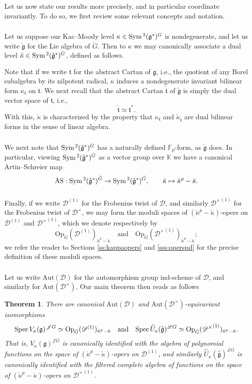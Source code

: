\documentclass{amsart}
\newtheorem{Thm}{Theorem}[subsection]
\theoremstyle{definition}
\newcommand{\sss}{\subsubsection{}}
\newcommand{\fg}{\mathfrak{g}}
\newcommand{\Spec}{\on{Spec}\hspace{.5mm}}
\newcommand{\ft}{\mathfrak{t}}
\newcommand{\fr}{^\on{(1)}}
\newcommand{\sD}{\mathscr{D}}
\newcommand{\Sym}{\on{Sym}\hspace{.5mm}}
\newcommand{\on}{\mathrm}
\newcommand{\Jet}{\mathscr{J}}
\newcommand{\Loop}{\mathscr{L}}
\newcommand{\K}{\mathbb{K}}
\newcommand{\pD}{\sD^\times}
\newcommand{\ckappa}{\check{\kappa}}
\newcommand{\Op}{\on{Op}}
\newcommand{\Aut}{\on{Aut}}
\numberwithin{equation}{section}
\begin{document}
{ 
\sss Let us now state our results more precisely, and in particular coordinate invariantly. To do so, we first review some relevant concepts and notation. 

\sss Let us suppose our Kac--Moody level $\kappa \in \Sym^2(\fg^*)^G$ is nondegenerate, and let us write $\check{\fg}$ for the Lie algebra of $\check{G}$. Then to $\kappa$ we may canonically associate a dual level   $\ckappa \in \Sym^2(\check{\fg}^*)^{\check{G}}$, defined as follows. 

Note that if we write $\ft$ for the abstract Cartan of $\fg$, i.e., the quotient of any Borel subalgebra by its nilpotent radical, $\kappa$ induces a nondegenerate invariant bilinear form $\kappa_\ft$ on $\ft$. We next recall that the abstract Cartan $\check{\ft}$ of $\check{\fg}$ is simply the dual vector space of $\ft$, i.e., $$\check{\ft} \simeq \ft^*.$$With this, $\ckappa$ is characterized by the property that $\kappa_\ft$ and $\ckappa_{\check{\ft}}$ are dual bilinear forms in the sense of linear algebra. 

\sss We next note that $\Sym^2(\check{\fg}^*)^{\check{G}}$ has a naturally defined $\mathbb{F}_p$-form, as $\check{\fg}$ does. In particular, viewing $\Sym^2(\check{\fg}^*)^{\check{G}}$ as a vector group over $\K$ we have a canonical Artin--Schreier map
$$\on{AS}: \Sym^2(\check{\fg}^*)^{\check{G}} \rightarrow \Sym^2(\check{\fg}^*)^{\check{G}}, \quad \quad \ckappa \mapsto \ckappa^p - \ckappa.$$

\sss Finally, if we write $\sD\fr$ for the Frobenius twist of $\sD$, and similarly ${\pD}\fr$ for the Frobenius twist of $\pD$, we may form the moduli spaces of $(\ckappa^p - \ckappa)$-opers on $\sD\fr$ and ${\pD}\fr$, which we denote respectively by 
$$\Op_{\check{G}}(\sD\fr)_{\ckappa^p - \ckappa} \quad \text{and} \quad \Op_{\check{G}}({\pD}\fr)_{\ckappa^p - \ckappa};$$
we refer the reader to Sections \ref{ss:kappaopers} and \ref{sss:operspd} for the precise definition of these moduli spaces.

\sss Let us write $\Aut(\sD)$ for the automorphism group ind-scheme of $\sD$, and similarly for $\Aut(\pD)$. Our main theorem then reads as follows

\begin{Thm} \label{t:thmintro} There are canonical $\Aut(\sD)$ and $\Aut(\pD)$-equivariant isomorphisms 
$$\Spec V_\kappa(\fg)^{\Jet G} \simeq \Op_{\check{G}}(\sD\fr)_{\ckappa^p - \ckappa} \quad \text{and} \quad \Spec \widehat{U}_\kappa(\hat{\fg})^{\Loop G} \simeq \Op_{\check{G}}({\pD}\fr)_{\ckappa^p - \ckappa}.$$
That is, $V_\kappa(\fg)^{\Jet G}$ is canonically identified with the algebra of polynomial functions on the space of $(\ckappa^p - \ckappa)$-opers on $\sD\fr$, and similarly $\widehat{U}_\kappa(\hat{\fg})^{\Loop G}$ is canonically identified with the filtered complete algebra of functions on the space of $(\ckappa^p - \ckappa)$-opers on ${\pD}\fr$. 
\end{Thm}

}
\end{document}
